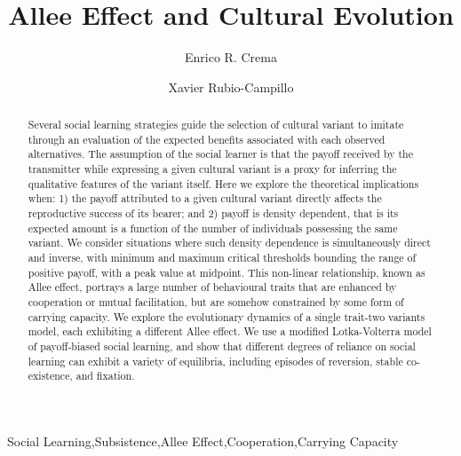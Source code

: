 \documentclass[review,authoryear]{elsarticle}
\begin{document}
\begin{frontmatter}

\title{Allee Effect and Cultural Evolution}


\author[label1,label2]{Enrico R. Crema}
\author[label3]{Xavier Rubio-Campillo}

\address[label1]{CaSEs - Complexity and Socio-Ecological Dynamics Research Group, Barcelona}
\address[label2]{UCL Institute of Archaeology}
\address[label3]{BSC - Barcelona Supercomputing Center}



\begin{abstract}
Several social learning strategies guide the selection of cultural variant to imitate through an evaluation of the expected benefits associated with each observed alternatives. The assumption of the social learner is that the payoff received by the transmitter while expressing a given cultural variant is a proxy for  inferring the qualitative features of the variant itself. Here we explore the theoretical implications when: 1) the payoff attributed to a given cultural variant directly affects the reproductive success of its bearer;  and 2) payoff is density dependent, that is its expected amount is a function of the number of individuals possessing the same variant. We consider situations where such density dependence is simultaneously direct and inverse, with minimum and maximum critical thresholds bounding the range of positive payoff, with a peak value at midpoint. This non-linear relationship, known as Allee effect, portrays a large number of behavioural traits that are enhanced by cooperation or mutual facilitation, but are somehow constrained by some form of carrying capacity.  We explore the evolutionary dynamics of a single trait-two variants model, each exhibiting a different Allee effect. We use a modified Lotka-Volterra model of payoff-biased social learning, and show that different degrees of reliance on social learning can exhibit a variety of equilibria, including episodes of reversion, stable co-existence, and fixation.

\end{abstract}

\begin{keyword}
Social Learning\sep Subsistence\sep Allee Effect\sep Cooperation\sep Carrying Capacity
\end{keyword}

\end{frontmatter}
\end{document}
